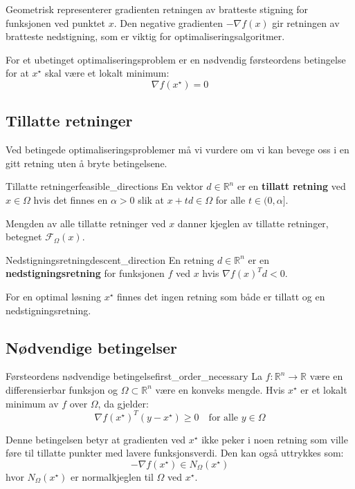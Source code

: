 Geometrisk representerer gradienten retningen av bratteste stigning for funksjonen ved punktet $x$. Den negative gradienten $-\nabla f(x)$ gir retningen av bratteste nedstigning, som er viktig for optimaliseringsalgoritmer.

For et ubetinget optimaliseringsproblem er en nødvendig førsteordens betingelse for at $x^\star$ skal være et lokalt minimum:
\[
	\nabla f(x^\star) = 0
\]

\subsection{Tillatte retninger}

Ved betingede optimaliseringsproblemer må vi vurdere om vi kan bevege oss i en gitt retning uten å bryte betingelsene.

\begin{definition}{Tillatte retninger}{feasible_directions}
	En vektor $d \in \mathbb{R}^n$ er en \textbf{tillatt retning} ved $x \in \Omega$ hvis det finnes en $\alpha > 0$ slik at $x + td \in \Omega$ for alle $t \in (0, \alpha]$.

	Mengden av alle tillatte retninger ved $x$ danner kjeglen av tillatte retninger, betegnet $\mathcal{F}_\Omega(x)$.
\end{definition}

\begin{definition}{Nedstigningsretning}{descent_direction}
	En retning $d \in \mathbb{R}^n$ er en \textbf{nedstigningsretning} for funksjonen $f$ ved $x$ hvis $\nabla f(x)^T d < 0$.
\end{definition}

For en optimal løsning $x^\star$ finnes det ingen retning som både er tillatt og en nedstigningsretning.

\subsection{Nødvendige betingelser}

\begin{theorem}{Førsteordens nødvendige betingelse}{first_order_necessary}
	La $f: \mathbb{R}^n \to \mathbb{R}$ være en differensierbar funksjon og $\Omega \subset \mathbb{R}^n$ være en konveks mengde. Hvis $x^\star$ er et lokalt minimum av $f$ over $\Omega$, da gjelder:
	\[
		\nabla f(x^\star)^T (y - x^\star) \geq 0 \quad \text{for alle } y \in \Omega
	\]
\end{theorem}

Denne betingelsen betyr at gradienten ved $x^\star$ ikke peker i noen retning som ville føre til tillatte punkter med lavere funksjonsverdi. Den kan også uttrykkes som:
\[
	-\nabla f(x^\star) \in N_\Omega(x^\star)
\]
hvor $N_\Omega(x^\star)$ er normalkjeglen til $\Omega$ ved $x^\star$.

